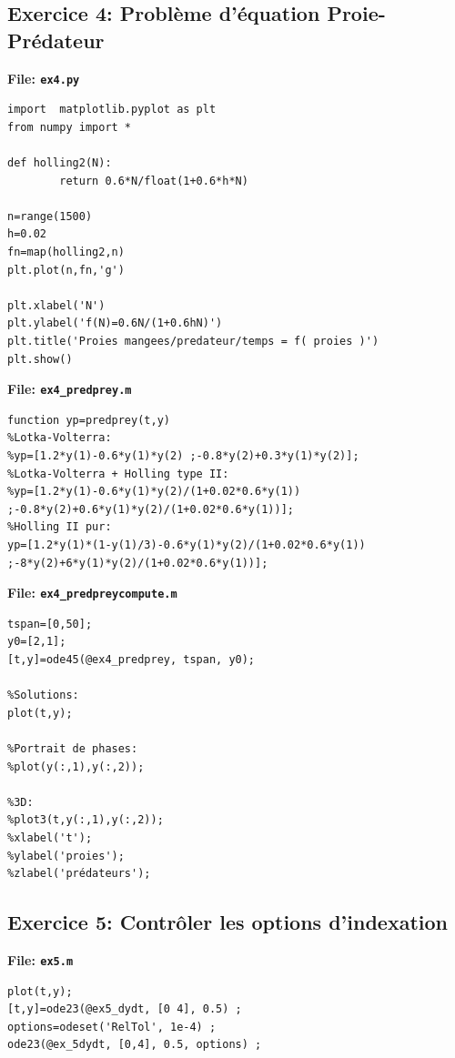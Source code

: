 \documentclass[a4paper,12pt,landscape]{article}
\begin{document}
\subsection{Exercice 4: Problème d'équation Proie-Prédateur}
\textbf{File: \texttt{ex4.py}}
\begin{tiny}
\begin{verbatim}
import  matplotlib.pyplot as plt
from numpy import *

def holling2(N):
        return 0.6*N/float(1+0.6*h*N)	

n=range(1500)
h=0.02
fn=map(holling2,n)
plt.plot(n,fn,'g')

plt.xlabel('N')
plt.ylabel('f(N)=0.6N/(1+0.6hN)')
plt.title('Proies mangees/predateur/temps = f( proies )')
plt.show()
\end{verbatim}
\end{tiny}

\textbf{File: \texttt{ex4\_predprey.m}}
\begin{tiny}
\begin{verbatim}
function yp=predprey(t,y)
%Lotka-Volterra:
%yp=[1.2*y(1)-0.6*y(1)*y(2) ;-0.8*y(2)+0.3*y(1)*y(2)];
%Lotka-Volterra + Holling type II:
%yp=[1.2*y(1)-0.6*y(1)*y(2)/(1+0.02*0.6*y(1)) ;-0.8*y(2)+0.6*y(1)*y(2)/(1+0.02*0.6*y(1))];
%Holling II pur:
yp=[1.2*y(1)*(1-y(1)/3)-0.6*y(1)*y(2)/(1+0.02*0.6*y(1)) ;-8*y(2)+6*y(1)*y(2)/(1+0.02*0.6*y(1))];
\end{verbatim}
\end{tiny}

\textbf{File: \texttt{ex4\_predpreycompute.m}}
\begin{tiny}
\begin{verbatim}
tspan=[0,50];
y0=[2,1];
[t,y]=ode45(@ex4_predprey, tspan, y0);

%Solutions:
plot(t,y);

%Portrait de phases:
%plot(y(:,1),y(:,2));

%3D:
%plot3(t,y(:,1),y(:,2));
%xlabel('t');
%ylabel('proies');
%zlabel('prédateurs');

\end{verbatim}
\end{tiny}
\subsection{Exercice 5: Contrôler les options d'indexation}
\textbf{File: \texttt{ex5.m}}
\begin{tiny}
\begin{verbatim}
plot(t,y);
[t,y]=ode23(@ex5_dydt, [0 4], 0.5) ;
options=odeset('RelTol', 1e-4) ;
ode23(@ex_5dydt, [0,4], 0.5, options) ; 
\end{verbatim}
\end{tiny}
\end{document}
